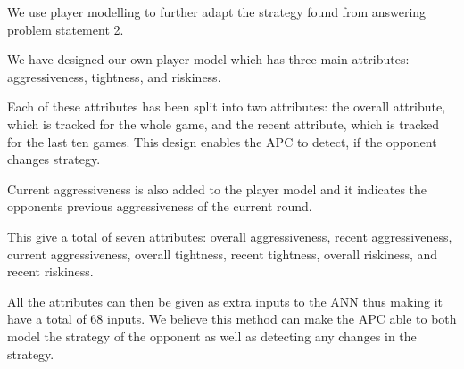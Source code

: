 We use player modelling to further adapt the strategy found from answering problem statement 2. 

We have designed our own player model which has three main attributes: aggressiveness, tightness, and riskiness.

Each of these attributes has been split into two attributes: the overall attribute, which is tracked for the whole game, and the recent attribute, which is tracked for the last ten games. This design enables the APC to detect, if the opponent changes strategy. 

Current aggressiveness is also added to the player model and it indicates the opponents previous aggressiveness of the current round.

This give a total of seven attributes: overall aggressiveness, recent aggressiveness, current aggressiveness, overall tightness, recent tightness, overall riskiness, and recent riskiness.

All the attributes can then be given as extra inputs to the ANN thus making it have a total of 68 inputs. We believe this method can make the APC able to both model the strategy of the opponent as well as detecting any changes in the strategy. 